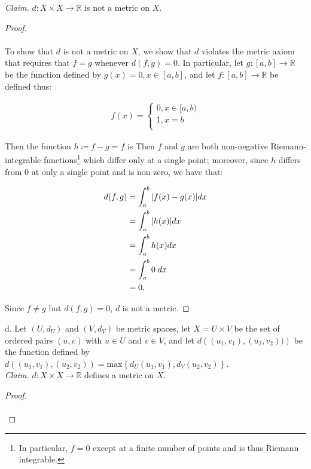     \emph{Claim.} $d: X \times X \to \mathbb{R}$ is not a metric on $X$.
    \ \\

    \begin{proof}\ \\\\
        To show that $d$ is not a metric on $X$, we show that $d$ violates the metric axiom that requires
        that $f = g$ whenever $d(f, g) = 0$. In particular, let $g:[a, b] \to \mathbb{R}$ be the function defined
        by $g(x) = 0, x \in [a, b]$, and let $f:[a, b] \to \mathbb{R}$ be defined thus:

        \begin{align*}
            f(x) = \begin{cases}
                0, x \in [a, b) \\
                1, x = b \\
            \end{cases}
        \end{align*}

        Then the function $h \coloneqq f - g = f$ is 
        Then $f$ and $g$ are both non-negative Riemann-integrable functions\footnote{
            In particular, $f = 0$ except at a finite number of points and is thus Riemann integrable.
        } which differ only at a single point; moreover, since $h$ differs from 0 at only a single point
        and is non-zero, we have that:
        
        \begin{align*}
            d(f, g) &= \int_a^b{|f(x) - g(x)|dx} \\
                    &= \int_a^b{|h(x)|dx} \\
                    &= \int_a^b{h(x) dx} \\
                    &= \int_a^b{0 \hspace{1mm} dx} \\
                    &= 0.
        \end{align*}

        Since $f \neq g$ but $d(f, g) = 0$, $d$ is not a metric.
            
    \end{proof}

    \pagebreak

d.  Let $(U, d_U)$ and $(V, d_V)$ be metric spaces, let $X = U \times V$
    be the set of ordered pairs $(u, v)$ with $u \in U$ and $v \in V$, and
    let $d\left((u_1, v_1), (u_2, v_2))\right)$ be the function defined by
    $d\left((u_1, v_1), (u_2, v_2)\right) 
     = \text{max}\left\{d_U(u_1, v_1), d_V(u_2, v_2)\right\}$. \ \\
    
    \emph{Claim.} $d:X \times X \to \mathbb{R}$ defines a metric on $X$.
    \ \\

    \begin{proof}\renewcommand{\qedsymbol}{}\ \\\\
    \end{proof}

    \pagebreak